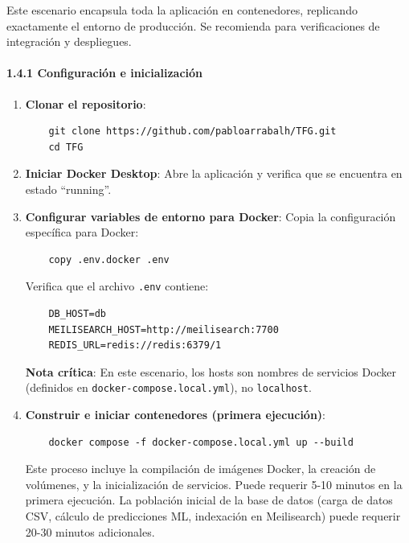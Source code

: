Este escenario encapsula toda la aplicación en contenedores, replicando exactamente el entorno de producción. Se recomienda para verificaciones de integración y despliegues.

\paragraph*{1.4.1 Configuración e inicialización}

\begin{enumerate}
    \item \textbf{Clonar el repositorio}:
    \begin{verbatim}
    git clone https://github.com/pabloarrabalh/TFG.git
    cd TFG
    \end{verbatim}
    
    \item \textbf{Iniciar Docker Desktop}: Abre la aplicación y verifica que se encuentra en estado ``running''.
    
    \item \textbf{Configurar variables de entorno para Docker}: Copia la configuración específica para Docker:
    \begin{verbatim}
    copy .env.docker .env
    \end{verbatim}
    
    Verifica que el archivo \texttt{.env} contiene:
    \begin{verbatim}
    DB_HOST=db
    MEILISEARCH_HOST=http://meilisearch:7700
    REDIS_URL=redis://redis:6379/1
    \end{verbatim}
    
    \textbf{Nota crítica}: En este escenario, los hosts son nombres de servicios Docker (definidos en \texttt{docker-compose.local.yml}), no \texttt{localhost}.
    
    \item \textbf{Construir e iniciar contenedores (primera ejecución)}:
    \begin{verbatim}
    docker compose -f docker-compose.local.yml up --build
    \end{verbatim}
    
    Este proceso incluye la compilación de imágenes Docker, la creación de volúmenes, y la inicialización de servicios.
    Puede requerir 5-10 minutos en la primera ejecución. La población inicial de la base de datos (carga de datos CSV,
    cálculo de predicciones ML, indexación en Meilisearch) puede requerir 20-30 minutos adicionales.


\end{enumerate}
